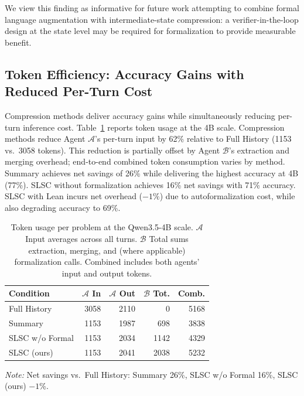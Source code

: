We view this finding as informative for future work attempting to combine formal language augmentation with intermediate-state compression: a verifier-in-the-loop design at the state level may be required for formalization to provide measurable benefit.


\subsection{Token Efficiency: Accuracy Gains with Reduced Per-Turn Cost}
\label{sec:token}

Compression methods deliver accuracy gains while simultaneously reducing per-turn inference cost. Table~\ref{tab:tokens} reports token usage at the 4B scale. Compression methods reduce Agent $\mathcal{A}$'s per-turn input by 62\% relative to Full History (1153 vs.\ 3058 tokens). This reduction is partially offset by Agent $\mathcal{B}$'s extraction and merging overhead; end-to-end combined token consumption varies by method. Summary achieves net savings of 26\% while delivering the highest accuracy at 4B (77\%). SLSC without formalization achieves 16\% net savings with 71\% accuracy. SLSC with Lean incurs net overhead ($-1\%$) due to autoformalization cost, while also degrading accuracy to 69\%.

\begin{table}[t]
  \centering
  \scriptsize
  \caption{Token usage per problem at the Qwen3.5-4B scale. $\mathcal{A}$ Input averages across all turns. $\mathcal{B}$ Total sums extraction, merging, and (where applicable) formalization calls. Combined includes both agents' input and output tokens.}
  \label{tab:tokens}
  \begin{tabular}{lrrrr}
    \toprule
    \textbf{Condition} & $\mathcal{A}$ \textbf{In} & $\mathcal{A}$ \textbf{Out} & $\mathcal{B}$ \textbf{Tot.} & \textbf{Comb.} \\
    \midrule
    Full History       & 3058 & 2110 & 0    & 5168 \\
    Summary            & 1153 & 1987 & 698  & 3838 \\
    SLSC w/o Formal    & 1153 & 2034 & 1142 & 4329 \\
    SLSC (ours)        & 1153 & 2041 & 2038 & 5232 \\
    \bottomrule
  \end{tabular}
  \vspace{2pt}

  \raggedright\scriptsize\textit{Note:} Net savings vs.\ Full History: Summary 26\%, SLSC w/o Formal 16\%, SLSC (ours) $-1$\%.
\end{table}

